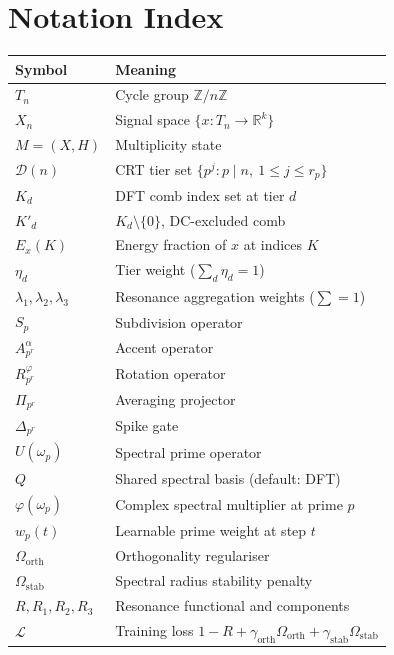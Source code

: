 \documentclass[11pt,a4paper]{article}
\theoremstyle{plain}
\theoremstyle{definition}
\theoremstyle{remark}
\newcommand{\tiers}{\mathcal{D}}
\newcommand{\Loss}{\mathcal{L}}
\begin{document}
\section{Notation Index}
\label{app:notation}

\begin{center}
\begin{tabular}{ll}
  \toprule
  Symbol & Meaning \\
  \midrule
  $T_n$ & Cycle group $\mathbb{Z}/n\mathbb{Z}$ \\
  $X_n$ & Signal space $\{x : T_n \to \mathbb{R}^k\}$ \\
  $M = (X, H)$ & Multiplicity state \\
  $\tiers(n)$ & CRT tier set $\{p^j : p \mid n,\ 1 \le j \le r_p\}$ \\
  $K_d$ & DFT comb index set at tier $d$ \\
  $K'_d$ & $K_d \setminus \{0\}$, DC-excluded comb \\
  $E_x(K)$ & Energy fraction of $x$ at indices $K$ \\
  $\eta_d$ & Tier weight ($\sum_d \eta_d = 1$) \\
  $\lambda_1, \lambda_2, \lambda_3$ & Resonance aggregation weights ($\sum = 1$) \\
  $S_p$ & Subdivision operator \\
  $A_{p^r}^\alpha$ & Accent operator \\
  $R_{p^r}^\varphi$ & Rotation operator \\
  $\Pi_{p^r}$ & Averaging projector \\
  $\Delta_{p^r}$ & Spike gate \\
  $U(\omega_p)$ & Spectral prime operator \\
  $Q$ & Shared spectral basis (default: DFT) \\
  $\varphi(\omega_p)$ & Complex spectral multiplier at prime $p$ \\
  $w_p(t)$ & Learnable prime weight at step $t$ \\
  $\Omega_\mathrm{orth}$ & Orthogonality regulariser \\
  $\Omega_\mathrm{stab}$ & Spectral radius stability penalty \\
  $R, R_1, R_2, R_3$ & Resonance functional and components \\
  $\Loss$ & Training loss $1 - R + \gamma_\mathrm{orth}\Omega_\mathrm{orth} + \gamma_\mathrm{stab}\Omega_\mathrm{stab}$ \\
  \bottomrule
\end{tabular}
\end{center}

\nocite{*}
  

\end{document}
